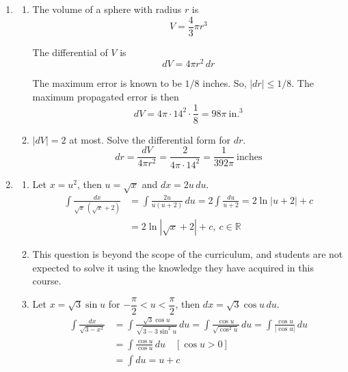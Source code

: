 \documentclass[a4paper, 12pt]{article}
\renewcommand{\headrulewidth}{0pt}
\begin{document}
\newpage
\pagestyle{fancy}
\renewcommand{\headrulewidth}{1pt}


\begin{enumerate}[leftmargin=*,label=\textbf{\arabic*.}]
\item
\begin{enumerate}[leftmargin=*,label=\textbf{\alph*.}]
\item The volume of a sphere with radius $r$ is
\[V=\frac43\pi r^3\]

The differential of $V$ is
\[dV=4\pi r^2\,dr\]

The maximum error is known to be $1/8$ inches. So, $|dr|\leq1/8$. The maximum propagated error is then
\[dV=4\pi\cdot14^2\cdot\dfrac18=\boxed{98\pi\:\text{in.}^3}\]

\item $|dV|=2$ at most. Solve the differential form for $dr$.
\[dr=\frac{dV}{4\pi r^2}=\frac{2}{4\pi\cdot 14^2}=\boxed{\frac1{392\pi}\:\text{inches}}\]
\end{enumerate}

\item
\begin{enumerate}[leftmargin=*,label=\textbf{\alph*.}]
\item Let $x=u^2$, then $u=\sqrt x$ and $dx=2u\,du$.
\begin{align*}\int\frac{dx}{\sqrt x\,\left(\sqrt x+2\right)}&=\int\frac{2u}{u(u+2)}\,du=2\int\frac{du}{u+2}=2\ln|u+2|+c\\[1em]&=\boxed{2\ln\left|\sqrt x+2\right|+c,\: c\in\mathbb{R}}\end{align*}

\item This question is beyond the scope of the curriculum, and students are not expected to solve it using the knowledge they have acquired in this course.

\item Let $x=\sqrt3\sin u$ for $-\dfrac\pi2<u<\dfrac\pi2$, then $dx=\sqrt3\cos u\,du$.
\begin{align*}\int\frac{dx}{\sqrt{3-x^2}}&=\int\frac{\sqrt3\cos u}{\sqrt{3-3\sin^2u}}\,du=\int\frac{\cos u}{\sqrt{\cos^2u}}\,du=\int\frac{\cos u}{|\cos u|}\,du\\[1em]&=\int\frac{\cos u}{\cos u}\,du\quad\left[\cos u>0\right]\\[1em]&=\int du=u+c\end{align*}


\end{enumerate}
\end{enumerate}
\end{document}
